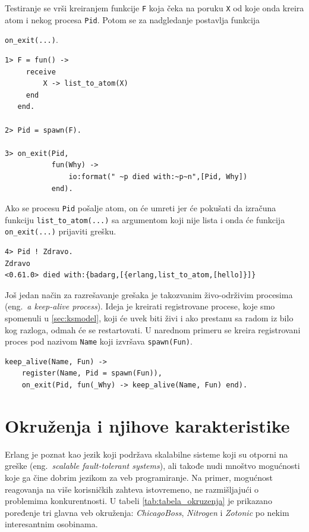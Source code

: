 \documentclass[a4paper]{article}
\begin{document}
Testiranje se vrši kreiranjem funkcije {\texttt{F}}
koja čeka na poruku {\texttt{X}} od koje onda kreira atom i nekog procesa {\texttt{Pid}}. 
Potom se za nadgledanje postavlja funkcija {\texttt{on_exit(...)}.
\begin{verbatim} 
1> F = fun() ->
     receive
         X -> list_to_atom(X)
     end
   end.

2> Pid = spawn(F).

3> on_exit(Pid,
           fun(Why) ->
               io:format(" ~p died with:~p~n",[Pid, Why])
           end).

\end{verbatim}

Ako se procesu {\texttt{Pid}} pošalje atom, on će umreti jer će pokušati da izračuna funkciju {\texttt{list_to_atom(...)}}
sa argumentom koji nije lista i onda će funkcija {\texttt{on_exit(...)}} prijaviti grešku.
\begin{verbatim} 
4> Pid ! Zdravo.
Zdravo
<0.61.0> died with:{badarg,[{erlang,list_to_atom,[hello]}]}
\end{verbatim}

Još jedan način za razrešavanje grešaka je takozvanim živo-održivim procesima (eng.~{\em a keep-alive process}). 
Ideja je kreirati registrovane procese, koje smo spomenuli u \ref{sec:ksmodel}, 
koji će uvek biti živi i ako prestanu sa radom iz bilo kog razloga, 
odmah će se restartovati. U narednom primeru se kreira registrovani proces pod nazivom {\texttt{Name}} koji izvršava {\texttt{spawn(Fun)}}. 
\begin{verbatim} 
keep_alive(Name, Fun) ->
    register(Name, Pid = spawn(Fun)),
    on_exit(Pid, fun(_Why) -> keep_alive(Name, Fun) end).
\end{verbatim}
 

\section{Okruženja i njihove karakteristike}
\label{sec:okruzenja}
Erlang je poznat kao jezik koji podržava skalabilne sisteme koji su otporni na greške (eng.~{\em scalable fault-tolerant systems}), 
ali takođe nudi mnoštvo mogućnosti koje ga čine dobrim jezikom za veb programiranje. Na primer, mogućnost reagovanja na više korisničkih zahteva istovremeno, 
ne razmišljajući o problemima konkurentnosti.
U tabeli \ref{tab:tabela_okruzenja} je prikazano poređenje tri glavna veb okruženja: {\em ChicagoBoss}, {\em Nitrogen} i {\em Zotonic} po nekim interesantnim osobinama.

}
\end{document}
